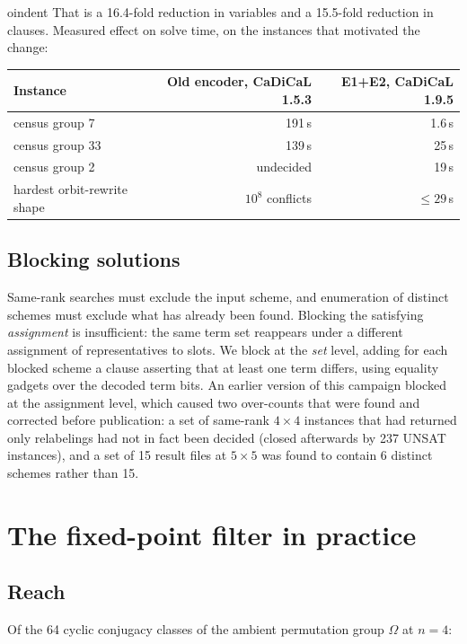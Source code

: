 \documentclass[11pt]{article}
\begin{document}
oindent That is a 16.4-fold reduction in variables and a 15.5-fold reduction in clauses. Measured
effect on solve time, on the instances that motivated the change:

\begin{center}
\begin{tabular}{lrr}
\toprule
Instance & Old encoder, CaDiCaL 1.5.3 & E1+E2, CaDiCaL 1.9.5 \\
\midrule
census group 7 & 191\,s & 1.6\,s \\
census group 33 & 139\,s & 25\,s \\
census group 2 & undecided & 19\,s \\
hardest orbit-rewrite shape & $10^{8}$ conflicts & $\leq 29$\,s \\
\bottomrule
\end{tabular}
\end{center}

\subsection{Blocking solutions}

Same-rank searches must exclude the input scheme, and enumeration of distinct schemes must exclude what
has already been found. Blocking the satisfying \emph{assignment} is insufficient: the same term set
reappears under a different assignment of representatives to slots. We block at the \emph{set} level,
adding for each blocked scheme a clause asserting that at least one term differs, using equality gadgets
over the decoded term bits. An earlier version of this campaign blocked at the assignment level, which
caused two over-counts that were found and corrected before publication: a set of same-rank $4\times4$
instances that had returned only relabelings had not in fact been decided (closed afterwards by 237
UNSAT instances), and a set of 15 result files at $5\times5$ was found to contain 6 distinct schemes
rather than 15.

\section{The fixed-point filter in practice}

\subsection{Reach}

Of the 64 cyclic conjugacy classes of the ambient permutation group $\Omega$ at $n=4$:
\end{document}
